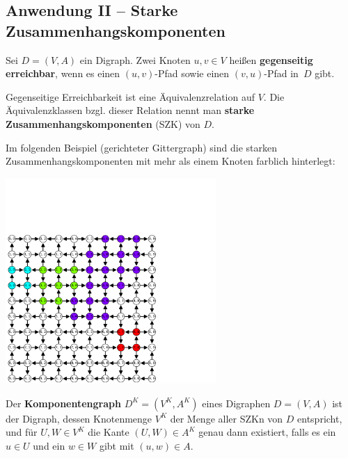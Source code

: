 \subsection{Anwendung II -- Starke Zusammenhangskomponenten}

\begin{defn}
Sei $D=(V,A)$ ein Digraph. Zwei	Knoten $u,v \in V$ heißen \textbf{gegenseitig erreichbar}, wenn es einen $(u,v)$-Pfad sowie einen $(v,u)$-Pfad in~$D$ gibt. 

Gegenseitige Erreichbarkeit ist eine Äquivalenzrelation auf $V$. Die Äquivalenzklassen bzgl. dieser Relation nennt man \textbf{starke Zusammenhangskomponenten} (SZK) von $D$. 
\end{defn} 

\begin{bsp}
Im folgenden Beispiel (gerichteter Gittergraph) sind die starken Zusammenhangskomponenten mit mehr als einem Knoten farblich hinterlegt:

\hfill
	\includegraphics[width=0.6\textwidth]{Code/strongly_connected_comp.pdf}
\hfill\,
\end{bsp}

\begin{defn}
	Der \textbf{Komponentengraph} $D^K=(V^K,A^K)$ eines Digraphen $D=(V,A)$
	ist der Digraph, dessen Knotenmenge $V^K$ der Menge aller SZKn von $D$ entspricht, und für $U,W \in V^K$ die Kante $(U,W) \in A^K$ genau dann existiert, falls es ein $u \in U$ und ein $w \in W$ gibt mit $(u,w) \in A$. 
\end{defn}


